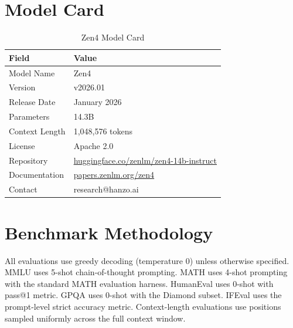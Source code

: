 \documentclass[11pt,a4paper]{article}
\begin{document}
\appendix

\section{Model Card}

\begin{table}[H]
\centering
\begin{tabular}{ll}
\toprule
\textbf{Field} & \textbf{Value} \\
\midrule
Model Name      & Zen4 \\
Version         & v2026.01 \\
Release Date    & January 2026 \\
Parameters      & 14.3B \\
Context Length  & 1,048,576 tokens \\
License         & Apache 2.0 \\
Repository      & \href{https://huggingface.co/zenlm/zen4-14b-instruct}{huggingface.co/zenlm/zen4-14b-instruct} \\
Documentation   & \href{https://papers.zenlm.org/zen4}{papers.zenlm.org/zen4} \\
Contact         & research@hanzo.ai \\
\bottomrule
\end{tabular}
\caption{Zen4 Model Card}
\end{table}

\section{Benchmark Methodology}

All evaluations use greedy decoding (temperature 0) unless otherwise specified. MMLU uses
5-shot chain-of-thought prompting. MATH uses 4-shot prompting with the standard MATH
evaluation harness. HumanEval uses 0-shot with pass@1 metric. GPQA uses 0-shot with
the Diamond subset. IFEval uses the prompt-level strict accuracy metric. Context-length
evaluations use positions sampled uniformly across the full context window.
\end{document}
